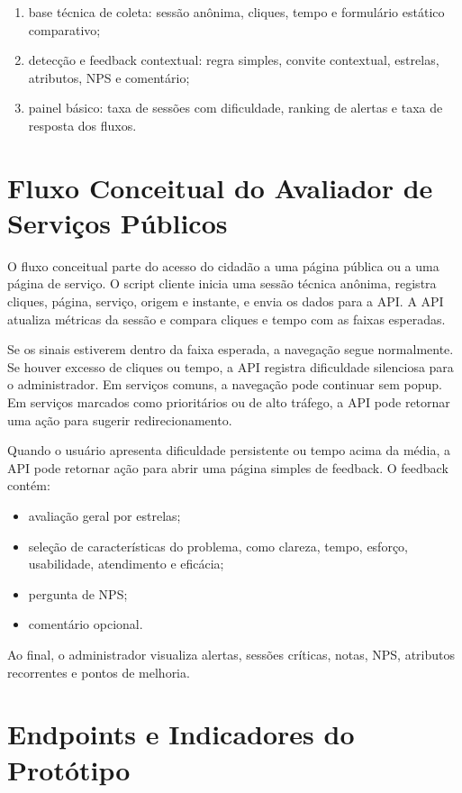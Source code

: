 \begin{apendicesenv}
\begin{enumerate}
    \item base técnica de coleta: sessão anônima, cliques, tempo e formulário
    estático comparativo;
    \item detecção e feedback contextual: regra simples, convite contextual,
    estrelas, atributos, NPS e comentário;
    \item painel básico: taxa de sessões com dificuldade, ranking de alertas e
    taxa de resposta dos fluxos.
\end{enumerate}

\chapter{Fluxo Conceitual do Avaliador de Serviços Públicos}

O fluxo conceitual parte do acesso do cidadão a uma página pública ou a uma
página de serviço. O script cliente inicia uma sessão técnica anônima, registra
cliques, página, serviço, origem e instante, e envia os dados para a API. A API
atualiza métricas da sessão e compara cliques e tempo com as faixas esperadas.

Se os sinais estiverem dentro da faixa esperada, a navegação segue normalmente.
Se houver excesso de cliques ou tempo, a API registra dificuldade silenciosa para
o administrador. Em serviços comuns, a navegação pode continuar sem popup. Em
serviços marcados como prioritários ou de alto tráfego, a API pode retornar uma
ação para sugerir redirecionamento.

Quando o usuário apresenta dificuldade persistente ou tempo acima da média, a API
pode retornar ação para abrir uma página simples de feedback. O feedback contém:

\begin{itemize}
    \item avaliação geral por estrelas;
    \item seleção de características do problema, como clareza, tempo, esforço,
    usabilidade, atendimento e eficácia;
    \item pergunta de NPS;
    \item comentário opcional.
\end{itemize}

Ao final, o administrador visualiza alertas, sessões críticas, notas, NPS,
atributos recorrentes e pontos de melhoria.

\chapter{Endpoints e Indicadores do Protótipo}


\end{apendicesenv}

